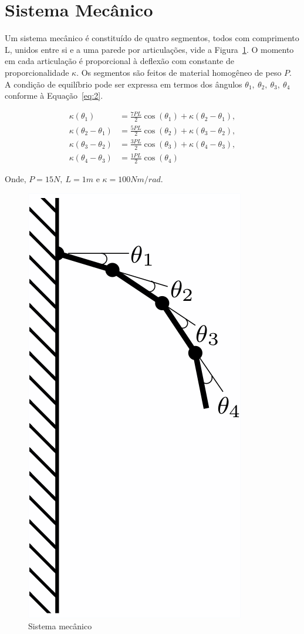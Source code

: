 \section{Sistema Mecânico}
Um sistema mecânico é constituído de quatro segmentos, todos com comprimento L, unidos entre si e a uma parede por articulações, vide a Figura~\ref{img:2}.
O momento em cada articulação é proporcional à deflexão com constante de proporcionalidade $\kappa$.
Os segmentos são feitos de material homogêneo de peso $P$.
A condição de equilíbrio pode ser expressa em termos dos ângulos $\theta_1,~\theta_2,~\theta_3,~\theta_4$ conforme à Equação~\ref{eq:2}.


\begin{equation}
\label{eq:2}
\begin{split}
    \kappa(\theta_1) 
     & = \frac{7PL}{2}  \cos(\theta_1) + \kappa(\theta_2 - \theta_1),
    \\ 
    \kappa(\theta_2 - \theta_1) 
    & = \frac{5PL}{2}  \cos(\theta_2) + \kappa(\theta_3 - \theta_2),
    \\ 
    \kappa(\theta_3 - \theta_2) 
    & = \frac{3PL}{2}  \cos(\theta_3) + \kappa(\theta_4 - \theta_3),
    \\ 
    \kappa(\theta_4 - \theta_3) 
    & =  \frac{1PL}{2} \cos(\theta_4)
\end{split}    
\end{equation}


Onde, $P = 15N,~ L = 1m$ e $\kappa = 100Nm/rad$.

\begin{figure}[!htp]
    \centering
    \includegraphics[scale=.2]{img/2.png}
    \caption{Sistema mecânico}
    \label{img:2}
\end{figure}







